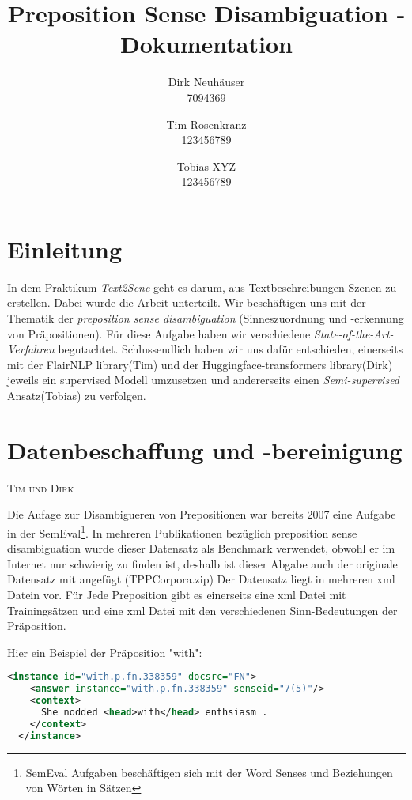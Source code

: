\documentclass[10pt,a4paper]{article}
\newcommand{\chapterauthor}[1]{%
	{\parindent0pt\vspace*{-5pt}\hspace*{\fill}%
  \linespread{1.1}\large\scshape#1%
  \par\nobreak\vspace*{10pt}}
}
\begin{document}
\title{Preposition Sense Disambiguation - Dokumentation}
 
\author{
Dirk Neuhäuser \\ 7094369
\and
Tim Rosenkranz \\ 123456789
\and 
Tobias XYZ \\ 123456789
}

\maketitle
\tableofcontents

\section{Einleitung}
In dem Praktikum \textit{Text2Sene} geht es darum, aus Textbeschreibungen Szenen zu erstellen. Dabei wurde die Arbeit unterteilt. Wir beschäftigen uns mit der Thematik der \textit{preposition sense disambiguation} (Sinneszuordnung und -erkennung von Präpositionen). Für diese Aufgabe haben wir verschiedene \textit{State-of-the-Art-Verfahren} begutachtet. Schlussendlich haben wir uns dafür entschieden, einerseits mit der FlairNLP library(Tim) und der Huggingface-transformers library(Dirk) jeweils ein supervised Modell umzusetzen und andererseits einen \textit{Semi-supervised} Ansatz(Tobias) zu verfolgen.

\section{Datenbeschaffung und -bereinigung}
\chapterauthor{Tim und Dirk}
Die Aufage zur Disambigueren von Prepositionen war bereits 2007 eine Aufgabe in der SemEval\footnote{SemEval Aufgaben beschäftigen sich mit der Word Senses und Beziehungen von Wörten in Sätzen}. In mehreren Publikationen bezüglich preposition sense disambiguation wurde dieser Datensatz als Benchmark verwendet, obwohl er im Internet nur schwierig zu finden ist, deshalb ist dieser Abgabe auch der originale Datensatz mit angefügt (TPPCorpora.zip)
Der Datensatz liegt in mehreren xml Datein vor. Für Jede Preposition gibt es einerseits eine xml Datei mit Trainingsätzen und eine xml Datei mit den verschiedenen Sinn-Bedeutungen der Präposition.

Hier ein Beispiel der Präposition "with": 

\begin{lstlisting}[language=xml]
  <instance id="with.p.fn.338359" docsrc="FN">
    <answer instance="with.p.fn.338359" senseid="7(5)"/>
    <context>
      She nodded <head>with</head> enthsiasm .
    </context>
  </instance>
\end{lstlisting}
\end{document}
